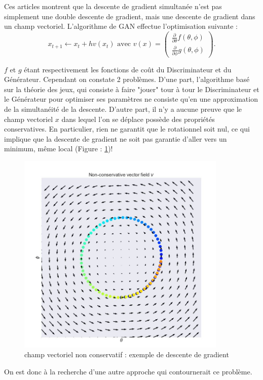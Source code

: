 Ces articles montrent que la descente de gradient simultanée n'est pas simplement une double descente de gradient, mais une descente de gradient dans un champ vectoriel. L'algorithme de GAN effectue l'optimisation suivante : 
\[x_{t+1} \leftarrow x_t + h v(x_t) \text{ avec } v(x) = \left(\begin{matrix}\frac{\partial}{\partial\theta}f(\theta, \phi)\\\frac{\partial}{\partial\phi}g(\theta, \phi)\end{matrix}\right).\]

$f$ et $g$ étant respectivement les fonctions de coût du Discriminateur et du Générateur. Cependant on constate 2 problèmes. D'une part, l'algorithme basé sur la théorie des jeux, qui consiste à faire "jouer" tour à tour le Discriminateur et le Générateur pour optimiser ses paramètres ne consiste qu'en une approximation de la simultanéité de la descente. D'autre part, il n'y a aucune preuve que le champ vectoriel $x$ dans lequel l'on se déplace possède des propriétés conservatives. En particulier, rien ne garantit que le rotationnel soit nul, ce qui implique que la descente de gradient ne soit pas garantie d'aller vers un minimum, même local (Figure : \ref{fig:vector_field})!

\begin{figure}[ht!]
  \centering
    \includegraphics[width=10cm]{fig/vector_field}
    \caption{champ vectoriel non conservatif : exemple de descente de gradient}
    \label{fig:vector_field}
\end{figure}

On est donc à la recherche d'une autre approche qui contournerait ce problème.



